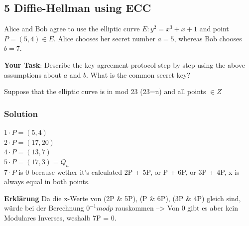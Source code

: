 \documentclass[11pt]{article}
\begin{document}
    \hypertarget{diffie-hellman-using-ecc}{%
\subsection{5 Diffie-Hellman using ECC}\label{diffie-hellman-using-ecc}}

Alice and Bob agree to use the elliptic curve \(E : y^2 = x^3 +x+1\) and
point \(P = (5,4) \in E\). Alice chooses her secret number \(a = 5\),
whereas Bob chooses \(b = 7\).

\textbf{Your Task}: Describe the key agreement protocol step by step
using the above assumptions about \(a\) and \(b\). What is the common
secret key?

Suppose that the elliptic curve is in mod 23 (23=n) and all points
\(\in Z\)

\hypertarget{solution}{%
\subsubsection{Solution}\label{solution}}

\(1\cdot P=(5,4)\)\\
\(2\cdot P=(17,20)\)\\
\(4\cdot P=(13,7)\)\\
\(5\cdot P=(17,3)=Q_a\)\\
\(7\cdot P\) is 0 because wether it's calculated 2P + 5P, or P + 6P, or
3P + 4P, x is always equal in both points.

\textbf{Erklärung} Da die x-Werte von (2P \& 5P), (P \& 6P), (3P \& 4P)
gleich sind, würde bei der Berechnung \(0^{-1} mod p\) rauskommen
--\textgreater{} Von 0 gibt es aber kein Modulares Inverses, weshalb 7P
= 0.
\end{document}
